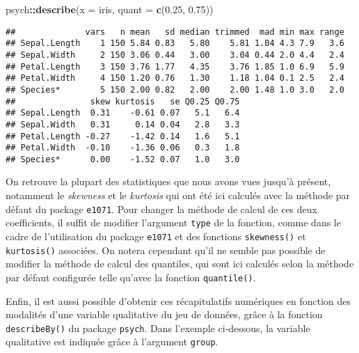 \documentclass[
  french,
]{book}
\newenvironment{Shaded}{\begin{snugshade}}{\end{snugshade}}
\newcommand{\DataTypeTok}[1]{\textcolor[rgb]{0.13,0.29,0.53}{#1}}
\newcommand{\FloatTok}[1]{\textcolor[rgb]{0.00,0.00,0.81}{#1}}
\newcommand{\KeywordTok}[1]{\textcolor[rgb]{0.13,0.29,0.53}{\textbf{#1}}}
\newcommand{\NormalTok}[1]{#1}
\newcommand{\OperatorTok}[1]{\textcolor[rgb]{0.81,0.36,0.00}{\textbf{#1}}}
\begin{document}
\begin{Shaded}
\begin{Highlighting}[]
\NormalTok{psych}\OperatorTok{::}\KeywordTok{describe}\NormalTok{(}\DataTypeTok{x =}\NormalTok{ iris, }\DataTypeTok{quant =} \KeywordTok{c}\NormalTok{(}\FloatTok{0.25}\NormalTok{, }\FloatTok{0.75}\NormalTok{))}
\end{Highlighting}
\end{Shaded}

\begin{verbatim}
##              vars   n mean   sd median trimmed  mad min max range
## Sepal.Length    1 150 5.84 0.83   5.80    5.81 1.04 4.3 7.9   3.6
## Sepal.Width     2 150 3.06 0.44   3.00    3.04 0.44 2.0 4.4   2.4
## Petal.Length    3 150 3.76 1.77   4.35    3.76 1.85 1.0 6.9   5.9
## Petal.Width     4 150 1.20 0.76   1.30    1.18 1.04 0.1 2.5   2.4
## Species*        5 150 2.00 0.82   2.00    2.00 1.48 1.0 3.0   2.0
##               skew kurtosis   se Q0.25 Q0.75
## Sepal.Length  0.31    -0.61 0.07   5.1   6.4
## Sepal.Width   0.31     0.14 0.04   2.8   3.3
## Petal.Length -0.27    -1.42 0.14   1.6   5.1
## Petal.Width  -0.10    -1.36 0.06   0.3   1.8
## Species*      0.00    -1.52 0.07   1.0   3.0
\end{verbatim}

On retrouve la plupart des statistiques que nous avons vues jusqu'à présent, notamment le \emph{skewness} et le \emph{kurtosis} qui ont été ici calculés avec la méthode par défaut du package \texttt{e1071}. Pour changer la méthode de calcul de ces deux coefficients, il suffit de modifier l'argument \texttt{type} de la fonction, comme dans le cadre de l'utilisation du package \texttt{e1071} et des fonctions \texttt{skewness()} et \texttt{kurtosis()} associées. On notera cependant qu'il ne semble pas possible de modifier la méthode de calcul des quantiles, qui sont ici calculés selon la méthode par défaut configurée telle qu'avec la fonction \texttt{quantile()}.

Enfin, il est aussi possible d'obtenir ces récapitulatifs numériques en fonction des modalités d'une variable qualitative du jeu de données, grâce à la fonction \texttt{describeBy()} du package \texttt{psych}. Dans l'exemple ci-dessous, la variable qualitative est indiquée grâce à l'argument \texttt{group}.

\begin{Shaded}
\end{Shaded}
\end{document}
